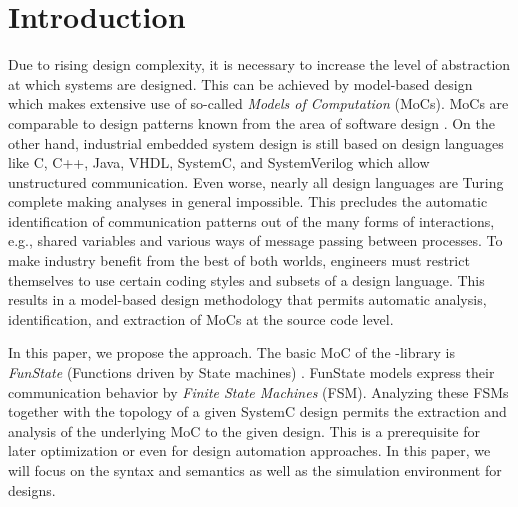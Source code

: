 
\chapter{Introduction}\label{sec:intro}

Due to rising design complexity, it is necessary to increase the level of abstraction at which systems are designed.
This can be achieved by model-based design which makes extensive use of so-called \emph{Models of Computation} \cite{embsft:2002} (MoCs).
MoCs are comparable to design patterns known from the area of software design \cite{gamma:1995}.
On the other hand, industrial embedded system design is still based on design languages like C, C++, Java, VHDL, SystemC, and SystemVerilog which allow unstructured communication.
Even worse, nearly all design languages are Turing complete making analyses in general impossible.
This precludes the automatic identification of communication patterns out of the many forms of interactions, e.g., shared variables and various ways of message passing between processes.
To make industry benefit from the best of both worlds, engineers must restrict themselves to use certain coding styles and subsets of a design language.
This results in a model-based design methodology that permits automatic analysis, identification, and extraction of MoCs at the source code level.



In this paper, we propose the \SysteMoC{} approach.
The basic MoC of the \SysteMoC{}-library is \emph{FunState} (Functions driven by State machines) \cite{stgzet:2001}.
FunState models express their communication behavior by \emph{Finite State Machines} (FSM).
Analyzing these FSMs together with the topology of a given SystemC design permits the extraction and analysis of the underlying MoC to the given design.
This is a prerequisite for later optimization or even for design automation approaches.
In this paper, we will focus on the \SysteMoC{} syntax and semantics as well as the simulation environment for \SysteMoC{} designs.


